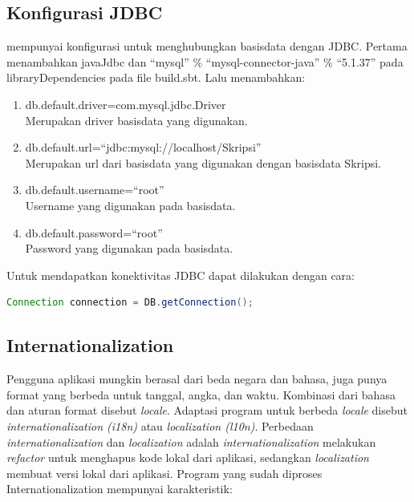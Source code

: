 \subsection{Konfigurasi JDBC}
\play mempunyai konfigurasi untuk menghubungkan basisdata dengan JDBC. Pertama menambahkan javaJdbc dan ``mysql'' \% ``mysql-connector-java'' \% ``5.1.37'' pada libraryDependencies pada file build.sbt. Lalu menambahkan:
\begin{enumerate}
	\item db.default.driver=com.mysql.jdbc.Driver\\
			Merupakan driver basisdata yang digunakan.
	\item db.default.url=``jdbc:mysql://localhost/Skripsi''\\
			Merupakan url dari basisdata yang digunakan dengan basisdata Skripsi.
	\item db.default.username=``root''\\
			Username yang digunakan pada basisdata.
	\item db.default.password=``root''\\
			Password yang digunakan pada basisdata.
\end{enumerate}

Untuk mendapatkan konektivitas JDBC dapat dilakukan dengan cara:

\begin{lstlisting}[caption=Contoh mendapatkan konektivitas JDBC,label = {lst_2_konek_jdbc},language=Java]
	Connection connection = DB.getConnection();
\end{lstlisting} 

\subsection{Internationalization}
Pengguna aplikasi mungkin berasal dari beda negara dan bahasa, juga punya format yang berbeda untuk tanggal, angka, dan waktu. Kombinasi dari bahasa dan aturan format disebut \textit{locale}. Adaptasi program untuk berbeda \textit{locale} disebut \textit{internationalization (i18n)} atau \textit{localization (l10n)}. Perbedaan \textit{internationalization} dan \textit{localization} adalah \textit{internationalization} melakukan \textit{refactor} untuk menghapus kode lokal dari aplikasi, sedangkan \textit{localization} membuat versi lokal dari aplikasi. Program yang sudah diproses Internationalization mempunyai karakteristik:

